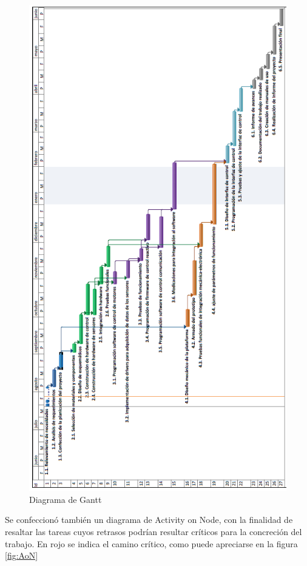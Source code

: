 \begin{figure}[htpb]
\centering 
\includegraphics[width=\textwidth]{./Figures/Gantt.PNG}
\caption{Diagrama de Gantt}
\label{fig:gantt2}
\end{figure}

\pagebreak

Se confeccionó también un diagrama de Activity on Node, con la finalidad de resaltar las tareas cuyos retrasos podrían resultar críticos para la concreción del trabajo. En rojo se indica el camino crítico, como puede apreciarse en la figura \ref{fig:AoN}

